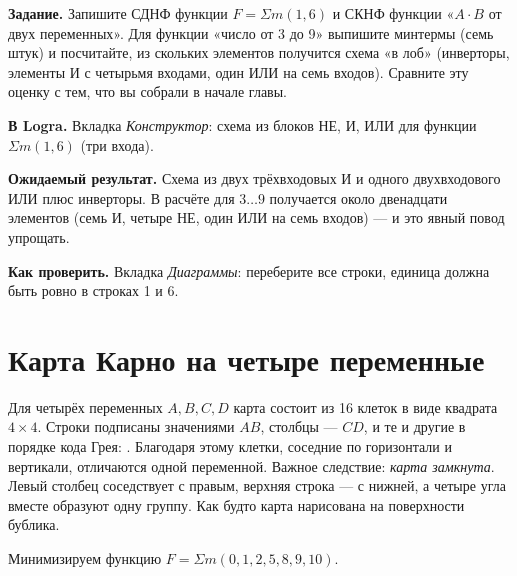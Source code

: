 \begin{diybox}
\textbf{Задание.}  Запишите СДНФ функции $F=\Sigma m(1,6)$ и
СКНФ функции «$A\cdot B$ от двух переменных».  Для
функции «число от 3 до 9» выпишите минтермы (семь штук) и посчитайте, из
скольких элементов получится схема «в лоб» (инверторы, элементы И с четырьмя
входами, один ИЛИ на семь входов).  Сравните эту оценку с тем, что
вы собрали в начале главы.

\textbf{В Logra.} Вкладка \emph{Конструктор}: схема из блоков НЕ, И, ИЛИ
для функции $\Sigma m(1,6)$ (три входа).

\textbf{Ожидаемый результат.} Схема из двух трёхвходовых И и одного
двухвходового ИЛИ плюс инверторы. В расчёте для $3\ldots 9$ получается около
двенадцати элементов (семь И, четыре НЕ, один ИЛИ на семь входов) --- и
это явный повод упрощать.

\textbf{Как проверить.} Вкладка \emph{Диаграммы}: переберите все строки,
единица должна быть ровно в строках 1 и 6.
\end{diybox}

\section{Карта Карно на четыре переменные}

Для четырёх переменных $A,B,C,D$ карта состоит из 16 клеток в виде квадрата
$4\times 4$. Строки подписаны значениями $AB$, столбцы --- $CD$, и те и
другие в порядке кода Грея: . Благодаря этому клетки,
соседние по горизонтали и вертикали, отличаются одной переменной. Важное
следствие: \emph{карта замкнута}. Левый столбец соседствует с правым, верхняя
строка --- с нижней, а четыре угла вместе образуют одну группу. Как будто карта
нарисована на поверхности бублика.

Минимизируем функцию $F = \Sigma m(0,1,2,5,8,9,10)$.

